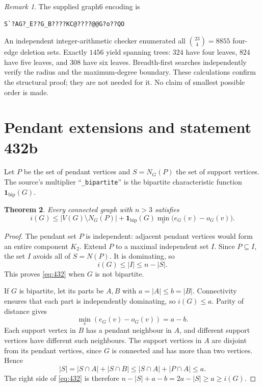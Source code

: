 \documentclass[11pt,a4paper]{article}
\newtheorem{theorem}{Theorem}[section]
\theoremstyle{remark}
\newtheorem{remark}[theorem]{Remark}
\newcommand{\bip}{\mathbf{1}_{\mathrm{bip}}}
\begin{document}
\begin{remark}\label{r7leaf:verification166}
The supplied graph6 encoding is
\begin{verbatim}
S`?AG?_E??G_B????KC@????@@G?o??QO
\end{verbatim}
An independent integer-arithmetic checker enumerated all
$\binom{23}{4}=8855$ four-edge deletion sets.  Exactly $1456$ yield spanning
trees: $324$ have four leaves, $824$ have five leaves, and $308$ have six
leaves.  Breadth-first searches independently verify the radius and the
maximum-degree boundary.  These calculations confirm the structural
proof; they are not needed for it.  No claim of smallest possible order
is made.
\end{remark}

\section{Pendant extensions and statement 432b}\label{sec:432}

Let $P$ be the set of pendant vertices and $S=N_G(P)$ the set of support
vertices. The source's multiplier ``\texttt{\_bipartite}'' is the
bipartite characteristic function $\bip(G)$.

\begin{theorem}\label{thm:432}
Every connected graph with $n>3$ satisfies
\begin{equation}\label{eq:432}
\boxed{i(G)\le |V(G)\setminus N_G(P)|+
\bip(G)\min_v\bigl(e_G(v)-o_G(v)\bigr).}
\end{equation}
\end{theorem}
\begin{proof}
The pendant set $P$ is independent: adjacent pendant vertices would form
an entire component $K_2$. Extend $P$ to a maximal independent set $I$.
Since $P\subseteq I$, the set $I$ avoids all of $S=N(P)$. It is
dominating, so
\begin{equation}\label{eq:pendantbound}
i(G)\le |I|\le n-|S|.
\end{equation}
This proves \eqref{eq:432} when $G$ is not bipartite.

If $G$ is bipartite, let its parts be $A,B$ with $a=|A|\le b=|B|$.
Connectivity ensures that each part is independently dominating, so
$i(G)\le a$. Parity of distance gives
\[
\min_v(e_G(v)-o_G(v))=a-b.
\]
Each support vertex in $B$ has a pendant neighbour in $A$, and different
support vertices have different such neighbours. The support vertices
in $A$ are disjoint from its pendant vertices, since $G$ is connected
and has more than two vertices. Hence
\[
|S|=|S\cap A|+|S\cap B|
\le |S\cap A|+|P\cap A|\le a.
\]
The right side of \eqref{eq:432} is therefore
$n-|S|+a-b=2a-|S|\ge a\ge i(G)$.
\end{proof}
\end{document}
